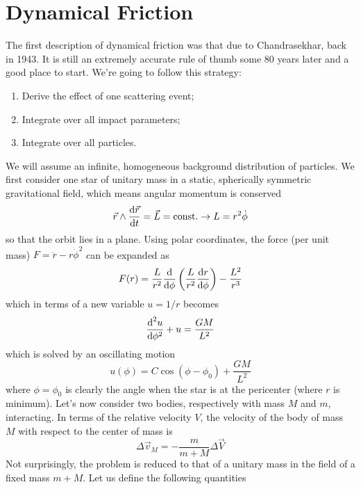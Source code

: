 \section{Dynamical Friction}

The first description of dynamical friction was that due to Chandrasekhar, back in 1943. It is still an extremely accurate rule of thumb some 80 years later and a good place to start. We're going to follow this strategy:
\begin{enumerate}
    \item Derive the effect of one scattering event;
    \item  Integrate over all impact parameters;
    \item  Integrate over all particles.
\end{enumerate}
We will assume an infinite, homogeneous background distribution of particles. We first consider one star of unitary mass in a static, spherically symmetric gravitational field, which means angular momentum is conserved
\begin{equation*}
    \vec{r}\wedge\frac{\text{d}\vec{r}}{\text{d}t} = \vec{L} = \text{const.} \to L = r^{2}\dot{\phi}
\end{equation*}
so that the orbit lies in a plane. Using polar coordinates, the force (per unit mass) $F = \ddot{r} - r\dot{\phi}^{2}$ can be expanded as
\begin{equation*}
    F(r) = \frac{L}{r^{2}}\frac{\text{d}}{\text{d}\phi}\left(\frac{L}{r^{2}}\frac{\text{d}r}{\text{d}\phi}\right)-\frac{L^{2}}{r^{3}}
\end{equation*}
which in terms of a new variable $u = 1/r$ becomes 
\begin{equation*}
    \frac{\text{d}^{2}u}{\text{d}\phi^{2}} + u = \frac{GM}{L^{2}}
\end{equation*}
which is solved by an oscillating motion
\begin{equation}
    u(\phi) = C\cos(\phi-\phi_{0}) +\frac{GM}{L^{2}}
\end{equation}
where $\phi = \phi_{0}$ is clearly the angle when the star is at the pericenter (where $r$ is minimum). Let's now consider two bodies, respectively with mass $M$ and $m$, interacting. In terms of the relative velocity $V$, the velocity of the body of mass $M$ with respect to the center of mass is 
\begin{equation*}
    \Delta \vec{v}_{M} = -\frac{m}{m+M}\Delta\vec{V}
\end{equation*}
Not surprisingly, the problem is reduced to that of a unitary mass in the field of a fixed mass $m+M$. Let us define the following quantities
